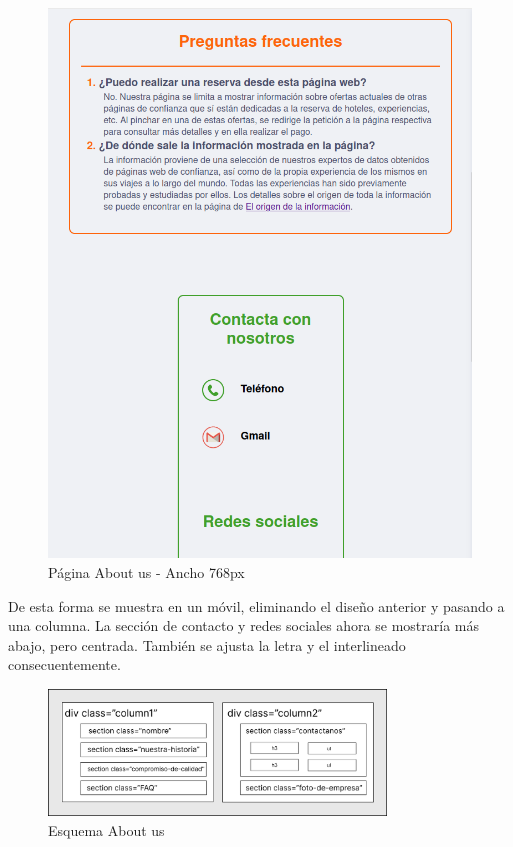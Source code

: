 \documentclass[11pt, a4paper]{book}
\begin{document}
	\begin{figure} [H]
		\centering
		\includegraphics[height=0.4\textheight]{CSS/3-6 768.png}
		\caption{Página About us - Ancho 768px}
	\end{figure}

	De esta forma se muestra en un móvil, eliminando el diseño anterior y pasando a una columna. La sección de contacto y redes sociales ahora se mostraría más abajo, pero centrada. También se ajusta la letra y el interlineado consecuentemente.
	
	\begin{figure} [H]
		\centering
		\includegraphics[width=0.8\textwidth]{CSS/CSS About us.jpg}
		\caption{Esquema About us}
	\end{figure}
\end{document}

